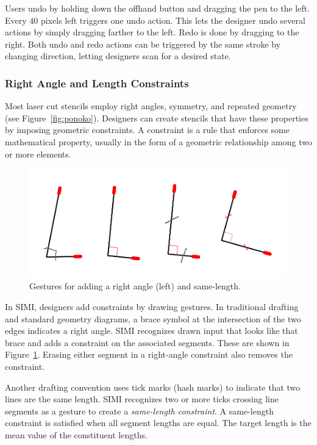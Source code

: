 \documentclass{article}
\begin{document}
Users undo by holding down the offhand button and dragging the pen to
the left. Every 40 pixels left triggers one undo action. This lets the
designer undo several actions by simply dragging farther to the
left. Redo is done by dragging to the right. Both undo and redo
actions can be triggered by the same stroke by changing direction,
letting designers scan for a desired state.

\subsubsection{Right Angle and Length Constraints}

Most laser cut stencils employ right angles, symmetry, and repeated
geometry (see Figure~\ref{fig:ponoko}). Designers can create stencils
that have these properties by imposing geometric constraints. A
constraint is a rule that enforces some mathematical property, usually
in the form of a geometric relationship among two or more
elements.

\begin{figure}[h]
  \centering
  \includegraphics[width=0.9\linewidth]{img/constraints-all.pdf}
  \caption{Gestures for adding a right angle (left) and same-length.}
  \label{fig:constraints}
\end{figure}

In SIMI, designers add constraints by drawing gestures. In traditional
drafting and standard geometry diagrams, a brace symbol at the
intersection of the two edges indicates a right angle. SIMI recognizes
drawn input that looks like that brace and adds a constraint on the
associated segments. These are shown in
Figure~\ref{fig:constraints}. Erasing either segment in a right-angle
constraint also removes the constraint.

Another drafting convention uses tick marks (hash marks) to indicate
that two lines are the same length. SIMI recognizes two or more ticks
crossing line segments as a gesture to create a \textit{same-length
  constraint}. A same-length constraint is satisfied when all segment
lengths are equal. The target length is the mean value of the
constituent lengths.
\end{document}
